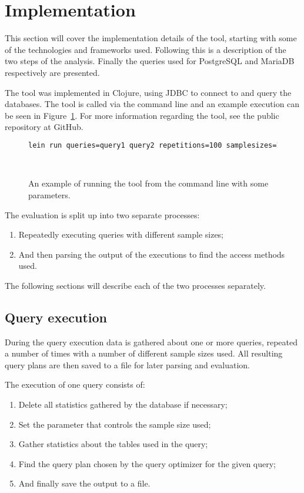 \section{Implementation}
This section will cover the implementation details of the tool, starting with
some of the technologies and frameworks used. Following this is a description of
the two steps of the analysis. Finally the queries used for PostgreSQL and
MariaDB respectively are presented.

The tool was implemented in Clojure, using JDBC to connect to and query the
databases. The tool is called via the command line and an example execution can
be seen in Figure~\ref{fig:cmd:running}. For more information regarding the
tool, see the public repository at GitHub.

\begin{figure}[ht]
  \caption[Running the tool from the command line]{An example of running the
  tool from the command line with some parameters.}
  \begin{lstlisting}[language=bash]
    lein run queries=query1 query2 repetitions=100 samplesizes=10 100 --database=postgresql
  \end{lstlisting}~\label{fig:cmd:running}
\end{figure}

The evaluation is split up into two separate processes:
\begin{enumerate}
\item Repeatedly executing queries with different sample sizes;
\item And then parsing the output of the executions to find the access methods used.
\end{enumerate}

The following sections will describe each of the two processes separately.

\subsection{Query execution}\label{sec:queryexecution}
During the query execution data is gathered about one or more queries, repeated
a number of times with a number of different sample sizes used. All resulting
query plans are then saved to a file for later parsing and evaluation.

The execution of one query consists of:
\begin{enumerate}
\item Delete all statistics gathered by the database if necessary;
\item Set the parameter that controls the sample size used;
\item Gather statistics about the tables used in the query;
\item Find the query plan chosen by the query optimizer for the given query;
\item And finally save the output to a file.
\end{enumerate}

